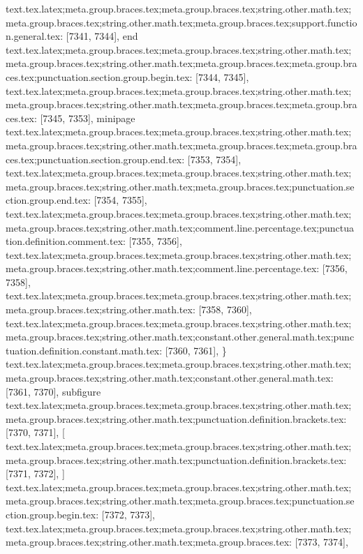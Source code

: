 {{{{{{{{{{{{{{{{{{{{{{{{{{{{{{{{{{{{{{{{{{{{{{{{{{{{{{{{{{{{{{{{{{{{{{{{{{{{{{{{{{{{{{{{{{{{{{{{{{{{{{{{{{{{{{{{{{{{{{{{{{{{{{{{{{{{{{{{{{{{{{{{{{{{{{{{{{{{{{{{{{{{{{{{{{{{{{{{{{{{{{{{{{{{{{{{{{{{text.tex.latex;meta.group.braces.tex;meta.group.braces.tex;string.other.math.tex;meta.group.braces.tex;string.other.math.tex;meta.group.braces.tex;support.function.general.tex: [7341, 7344], {end}
text.tex.latex;meta.group.braces.tex;meta.group.braces.tex;string.other.math.tex;meta.group.braces.tex;string.other.math.tex;meta.group.braces.tex;meta.group.braces.tex;punctuation.section.group.begin.tex: [7344, 7345], {{}
text.tex.latex;meta.group.braces.tex;meta.group.braces.tex;string.other.math.tex;meta.group.braces.tex;string.other.math.tex;meta.group.braces.tex;meta.group.braces.tex: [7345, 7353], {minipage}
text.tex.latex;meta.group.braces.tex;meta.group.braces.tex;string.other.math.tex;meta.group.braces.tex;string.other.math.tex;meta.group.braces.tex;meta.group.braces.tex;punctuation.section.group.end.tex: [7353, 7354], {}}
text.tex.latex;meta.group.braces.tex;meta.group.braces.tex;string.other.math.tex;meta.group.braces.tex;string.other.math.tex;meta.group.braces.tex;punctuation.section.group.end.tex: [7354, 7355], {}}
text.tex.latex;meta.group.braces.tex;meta.group.braces.tex;string.other.math.tex;meta.group.braces.tex;string.other.math.tex;comment.line.percentage.tex;punctuation.definition.comment.tex: [7355, 7356], {%
text.tex.latex;meta.group.braces.tex;meta.group.braces.tex;string.other.math.tex;meta.group.braces.tex;string.other.math.tex;comment.line.percentage.tex: [7356, 7358], {%
}
text.tex.latex;meta.group.braces.tex;meta.group.braces.tex;string.other.math.tex;meta.group.braces.tex;string.other.math.tex: [7358, 7360], {  }
text.tex.latex;meta.group.braces.tex;meta.group.braces.tex;string.other.math.tex;meta.group.braces.tex;string.other.math.tex;constant.other.general.math.tex;punctuation.definition.constant.math.tex: [7360, 7361], {\}
text.tex.latex;meta.group.braces.tex;meta.group.braces.tex;string.other.math.tex;meta.group.braces.tex;string.other.math.tex;constant.other.general.math.tex: [7361, 7370], {subfigure}
text.tex.latex;meta.group.braces.tex;meta.group.braces.tex;string.other.math.tex;meta.group.braces.tex;string.other.math.tex;punctuation.definition.brackets.tex: [7370, 7371], {[}
text.tex.latex;meta.group.braces.tex;meta.group.braces.tex;string.other.math.tex;meta.group.braces.tex;string.other.math.tex;punctuation.definition.brackets.tex: [7371, 7372], {]}
text.tex.latex;meta.group.braces.tex;meta.group.braces.tex;string.other.math.tex;meta.group.braces.tex;string.other.math.tex;meta.group.braces.tex;punctuation.section.group.begin.tex: [7372, 7373], {{}
text.tex.latex;meta.group.braces.tex;meta.group.braces.tex;string.other.math.tex;meta.group.braces.tex;string.other.math.tex;meta.group.braces.tex: [7373, 7374], {
}}}}}}}}}}}}}}}}}}}}}}}}}}}}}}}}}}}}}}}}}}}}}}}}}}}}}}}}}}}}}}}}}}}}}}}}}}}}}}}}}}}}}}}}}}}}}}}}}}}}}}}}}}}}}}}}}}}}}}}}}}}}}}}}}}}}}}}}}}}}}}}}}}}}}}}}}}}}}}}}}}}}}}}}}}}}}}}}}}}}}}}}}}}}}}}}}}}}}}}

